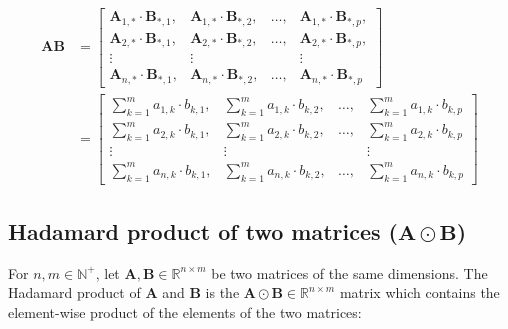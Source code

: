 \documentclass[titlepage]{article}
\begin{document}
        \begin{align*}
          \mathbf{AB}
            & = \begin{bmatrix}
                  \mathbf{A}_{1,*} \cdot \mathbf{B}_{*,1},
                    & \mathbf{A}_{1,*} \cdot \mathbf{B}_{*,2},
                    & \ldots,
                    & \mathbf{A}_{1,*} \cdot \mathbf{B}_{*,p}, \\
                  \mathbf{A}_{2,*} \cdot \mathbf{B}_{*,1},
                    & \mathbf{A}_{2,*} \cdot \mathbf{B}_{*,2},
                    & \ldots,
                    & \mathbf{A}_{2,*} \cdot \mathbf{B}_{*,p}, \\
                  \vdots & \vdots & & \vdots \\
                  \mathbf{A}_{n,*} \cdot \mathbf{B}_{*,1},
                    & \mathbf{A}_{n,*} \cdot \mathbf{B}_{*,2},
                    & \ldots,
                    & \mathbf{A}_{n,*} \cdot \mathbf{B}_{*,p}
                \end{bmatrix} \\
            & = \begin{bmatrix}
                  \sum_{k=1}^m a_{1,k} \cdot b_{k,1},
                    & \sum_{k=1}^m a_{1,k} \cdot b_{k,2},
                    & \ldots,
                    & \sum_{k=1}^m a_{1,k} \cdot b_{k,p} \\
                  \sum_{k=1}^m a_{2,k} \cdot b_{k,1},
                    & \sum_{k=1}^m a_{2,k} \cdot b_{k,2},
                    & \ldots,
                    & \sum_{k=1}^m a_{2,k} \cdot b_{k,p} \\
                  \vdots & \vdots & & \vdots \\
                  \sum_{k=1}^m a_{n,k} \cdot b_{k,1},
                    & \sum_{k=1}^m a_{n,k} \cdot b_{k,2},
                    & \ldots,
                    & \sum_{k=1}^m a_{n,k} \cdot b_{k,p}
                \end{bmatrix}
        \end{align*}

      \subsection{%
        Hadamard product of two matrices ($\mathbf{A} \odot \mathbf{B}$)
      }

        For $n, m \in \mathbb{N}^+$, let
        $\mathbf{A}, \mathbf{B} \in \mathbb{R}^{n \times m}$ be
        two matrices of the same dimensions. The Hadamard product of
        $\mathbf{A}$ and $\mathbf{B}$ is the
        $\mathbf{A} \odot \mathbf{B} \in \mathbb{R}^{n \times m}$ matrix which
        contains the element-wise product of the elements of the two matrices:
\end{document}
